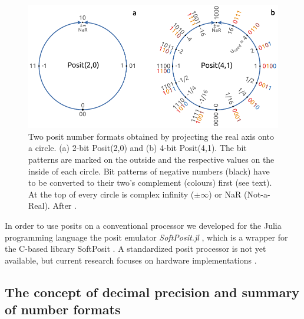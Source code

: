 \documentclass[draft]{agujournal2019}
\begin{document}
\begin{figure}[htbp]
\center
\includegraphics[width=1\textwidth]{circles.pdf}
\caption{Two posit number formats obtained by projecting the real axis onto a circle. (a) 2-bit Posit(2,0) and (b) 4-bit Posit(4,1). The bit patterns are marked on the outside and the respective values on the inside of each circle. Bit patterns of negative numbers (black) have to be converted to their two's complement (colours) first (see text). At the top of every circle is complex infinity ($\pm \infty$) or NaR (Not-a-Real). After .}
\label{fig:circle}
\end{figure}

In order to use posits on a conventional processor we developed for the Julia programming language \cite{Bezanson2017} the posit emulator \emph{SoftPosit.jl} \cite{Klower2019a}, which is a wrapper for the C-based library SoftPosit \cite{Leong2020}. A standardized posit processor is not yet available, but current research focuses on hardware implementations \cite{Zhang2020,vanDam2019,Chen2018,Chaurasiya2018,Glaser2017}.

\subsection{The concept of decimal precision and summary of number formats}
\label{sec:decprec}
\end{document}
